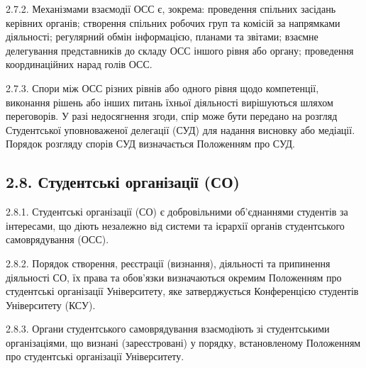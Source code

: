     2.7.2. Механізмами взаємодії ОСС є, зокрема: проведення спільних засідань керівних органів; створення спільних робочих груп та комісій за напрямками діяльності; регулярний обмін інформацією, планами та звітами; взаємне делегування представників до складу ОСС іншого рівня або органу; проведення координаційних нарад голів ОСС.

    2.7.3. Спори між ОСС різних рівнів або одного рівня щодо компетенції, виконання рішень або інших питань їхньої діяльності вирішуються шляхом переговорів. У разі недосягнення згоди, спір може бути передано на розгляд Студентської уповноваженої делегації (СУД) для надання висновку або медіації. Порядок розгляду спорів СУД визначається Положенням про СУД.

\subsection*{2.8. Студентські організації (СО)}
    2.8.1. Студентські організації (СО) є добровільними об'єднаннями студентів за інтересами, що діють незалежно від системи та ієрархії органів студентського самоврядування (ОСС).

    2.8.2. Порядок створення, реєстрації (визнання), діяльності та припинення діяльності СО, їх права та обов'язки визначаються окремим Положенням про студентські організації Університету, яке затверджується Конференцією студентів Університету (КСУ).

    2.8.3. Органи студентського самоврядування взаємодіють зі студентськими організаціями, що визнані (зареєстровані) у порядку, встановленому Положенням про студентські організації Університету.